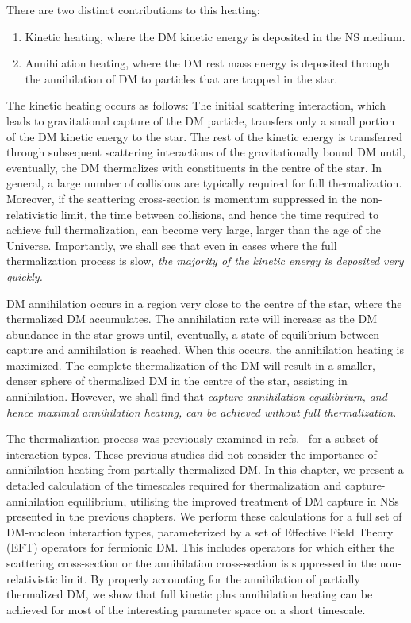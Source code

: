 There are two distinct contributions to this heating: 
\begin{enumerate}
    \item Kinetic heating, where the DM kinetic energy is deposited in the NS medium. 
    \item Annihilation heating, where the DM rest mass energy is deposited through the annihilation of DM to particles that are trapped in the star.
\end{enumerate}


The kinetic heating occurs as follows: The initial scattering interaction, which leads to gravitational capture of the DM particle, transfers only a small portion of the DM kinetic energy to the star.  The rest of the kinetic energy is transferred through subsequent scattering interactions of the gravitationally bound DM until, eventually, the DM thermalizes with constituents in the centre of the star.  In general, a large number of collisions are typically required for full thermalization.  Moreover, if the scattering cross-section is momentum suppressed in the non-relativistic limit, the time between collisions, and hence the time required to achieve full thermalization, can become very large, larger than the age of the Universe.  Importantly, we shall see that even in cases where the full thermalization process is slow, {\it the majority of the kinetic energy is deposited very quickly.} 


DM annihilation occurs in a region very close to the centre of the star, where the thermalized DM accumulates.  The annihilation rate will increase as the DM abundance in the star grows until, eventually, a state of equilibrium between capture and annihilation is reached.  When this occurs, the annihilation heating is maximized.  The complete thermalization of the DM will result in a smaller, denser sphere of thermalized DM in the centre of the star, assisting in annihilation.  However, we shall find that {\it capture-annihilation equilibrium, and hence maximal annihilation heating, can be achieved \it without full thermalization}.


The thermalization process was previously examined in refs.~\cite{Bertoni:2013bsa_dec_DarkMatterThermalization,Garani:2020wge_Observingthermalizationdark} for a subset of interaction types. These previous studies did not consider the importance of annihilation heating from partially thermalized DM. In this chapter, we present a detailed calculation of the timescales required for thermalization and capture-annihilation equilibrium, utilising the improved treatment of DM capture in NSs presented in the previous chapters. We perform these calculations for a full set of DM-nucleon interaction types, parameterized by a set of Effective Field Theory (EFT) operators for fermionic DM.  This includes operators for which either the scattering cross-section or the annihilation cross-section is suppressed in the non-relativistic limit.  By properly accounting for the annihilation of partially thermalized DM, we show that full kinetic plus annihilation heating can be achieved for most of the interesting parameter space on a short timescale.

